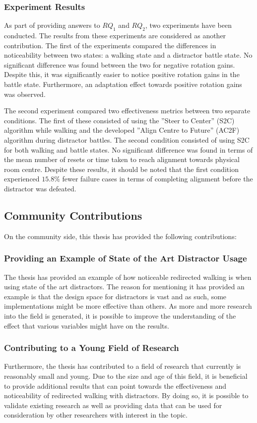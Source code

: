 \subsubsection{Experiment Results}
As part of providing answers to $RQ_1$ and $RQ_2$, two experiments have been conducted. The results from these experiments are considered as another contribution. The first of the experiments compared the differences in noticeability between two states: a walking state and a distractor battle state. No significant difference was found between the two for negative rotation gains. Despite this, it was significantly easier to notice positive rotation gains in the battle state. Furthermore, an adaptation effect towards positive rotation gains was observed.

The second experiment compared two effectiveness metrics between two separate conditions. The first of these consisted of using the ''Steer to Center'' (S2C) algorithm while walking and the developed ''Align Centre to Future'' (AC2F) algorithm during distractor battles. The second condition consisted of using S2C for both walking and battle states. No significant difference was found in terms of the mean number of resets or time taken to reach alignment towards physical room centre. Despite these results, it should be noted that the first condition experienced $15.8\%$ fewer failure cases in terms of completing alignment before the distractor was defeated. 

\subsection{Community Contributions}
On the community side, this thesis has provided the following contributions:

\subsubsection{Providing an Example of State of the Art Distractor Usage}
The thesis has provided an example of how noticeable redirected walking is when using state of the art distractors. The reason for mentioning it has provided an example is that the design space for distractors is vast and as such, some implementations might be more effective than others. As more and more research into the field is generated, it is possible to improve the understanding of the effect that various variables might have on the results. 

\subsubsection{Contributing to a Young Field of Research}
Furthermore, the thesis has contributed to a field of research that currently is reasonably small and young. Due to the size and age of this field, it is beneficial to provide additional results that can point towards the effectiveness and noticeability of redirected walking with distractors. By doing so, it is possible to validate existing research as well as providing data that can be used for consideration by other researchers with interest in the topic. 

